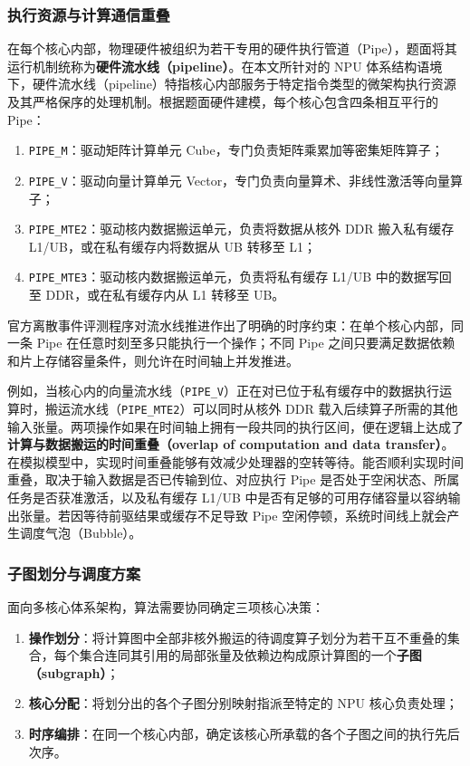 \documentclass[anonymous,withtoc]{gmcm2026}
\providecommand{\tightlist}{\setlength{\itemsep}{0pt}\setlength{\parskip}{0pt}}
\begin{document}
\subsubsection{执行资源与计算通信重叠}

在每个核心内部，物理硬件被组织为若干专用的硬件执行管道（Pipe），题面将其运行机制统称为\textbf{硬件流水线（pipeline）}。在本文所针对的 NPU 体系结构语境下，硬件流水线（pipeline）特指核心内部服务于特定指令类型的微架构执行资源及其严格保序的处理机制。根据题面硬件建模，每个核心包含四条相互平行的 Pipe：

\begin{enumerate}
\def\labelenumi{\arabic{enumi}.}
\tightlist
\item
  \texttt{PIPE\_M}：驱动矩阵计算单元 Cube，专门负责矩阵乘累加等密集矩阵算子；
\item
  \texttt{PIPE\_V}：驱动向量计算单元 Vector，专门负责向量算术、非线性激活等向量算子；
\item
  \texttt{PIPE\_MTE2}：驱动核内数据搬运单元，负责将数据从核外 DDR 搬入私有缓存 L1/UB，或在私有缓存内将数据从 UB 转移至 L1；
\item
  \texttt{PIPE\_MTE3}：驱动核内数据搬运单元，负责将私有缓存 L1/UB 中的数据写回至 DDR，或在私有缓存内从 L1 转移至 UB。
\end{enumerate}

官方离散事件评测程序对流水线推进作出了明确的时序约束：在单个核心内部，同一条 Pipe 在任意时刻至多只能执行一个操作；不同 Pipe 之间只要满足数据依赖和片上存储容量条件，则允许在时间轴上并发推进。

例如，当核心内的向量流水线（\texttt{PIPE\_V}）正在对已位于私有缓存中的数据执行运算时，搬运流水线（\texttt{PIPE\_MTE2}）可以同时从核外 DDR 载入后续算子所需的其他输入张量。两项操作如果在时间轴上拥有一段共同的执行区间，便在逻辑上达成了\textbf{计算与数据搬运的时间重叠（overlap of computation and data transfer）}。在模拟模型中，实现时间重叠能够有效减少处理器的空转等待。能否顺利实现时间重叠，取决于输入数据是否已传输到位、对应执行 Pipe 是否处于空闲状态、所属任务是否获准激活，以及私有缓存 L1/UB 中是否有足够的可用存储容量以容纳输出张量。若因等待前驱结果或缓存不足导致 Pipe 空闲停顿，系统时间线上就会产生调度气泡（Bubble）。

\subsubsection{子图划分与调度方案}

面向多核心体系架构，算法需要协同确定三项核心决策：

\begin{enumerate}
\def\labelenumi{\arabic{enumi}.}
\tightlist
\item
  \textbf{操作划分}：将计算图中全部非核外搬运的待调度算子划分为若干互不重叠的集合，每个集合连同其引用的局部张量及依赖边构成原计算图的一个\textbf{子图（subgraph）}；
\item
  \textbf{核心分配}：将划分出的各个子图分别映射指派至特定的 NPU 核心负责处理；
\item
  \textbf{时序编排}：在同一个核心内部，确定该核心所承载的各个子图之间的执行先后次序。
\end{enumerate}
\end{document}
